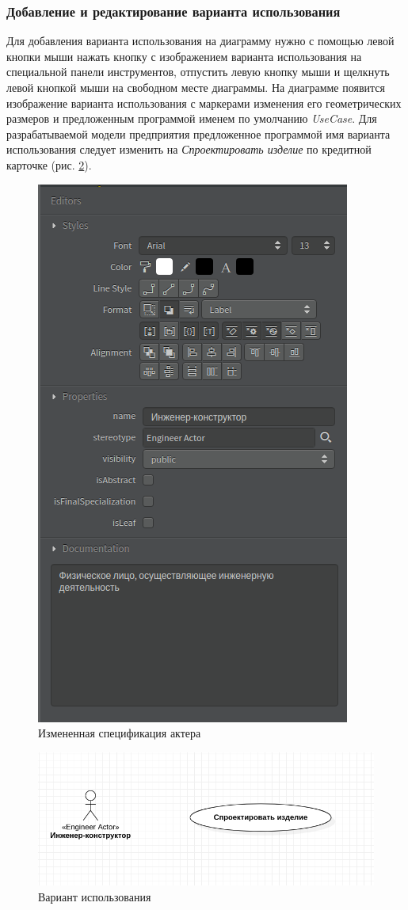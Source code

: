 \documentclass[a4paper,12pt]{report}
\begin{document}
\subsubsection{Добавление и редактирование варианта использования}
Для добавления варианта использования на диаграмму нужно с помощью левой кнопки мыши нажать кнопку с изображением варианта использования на специальной панели инструментов, отпустить левую кнопку мыши и щелкнуть левой кнопкой мыши на свободном месте диаграммы. На диаграмме появится изображение варианта использования с маркерами изменения его геометрических размеров и предложенным программой именем по умолчанию \textit{UseCase}. Для разрабатываемой модели предприятия предложенное программой имя варианта использования следует изменить на \textit{Спроектировать изделие} по кредитной карточке (рис. \ref{fig:usecaseproectdaction}).
\newpage
\begin{figure}[h!]
	\centering
	\includegraphics[width=0.35\linewidth]{images/actor1editors2}
	\caption{Измененная спецификация актера}
	\label{fig:actor1editors2}
\end{figure}

\begin{figure}[h!]
	\centering
	\includegraphics[width=0.8\linewidth]{images/usecaseproectdaction}
	\caption{Вариант использования}
	\label{fig:usecaseproectdaction}
\end{figure}
\end{document}
